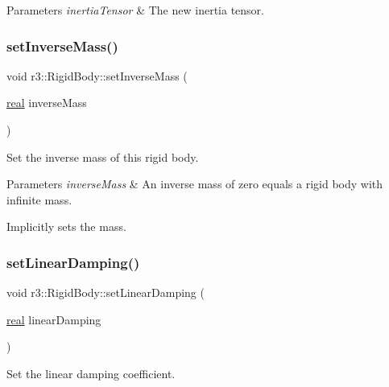 \begin{DoxyParams}{Parameters}
{\em inertia\+Tensor} & The new inertia tensor. \\
\hline
\end{DoxyParams}
\mbox{\label{classr3_1_1_rigid_body_a28ee9e1542663a4e704077e9327ddece}} 
\subsubsection{\texorpdfstring{set\+Inverse\+Mass()}{setInverseMass()}}
{\footnotesize\ttfamily void r3\+::\+Rigid\+Body\+::set\+Inverse\+Mass (\begin{DoxyParamCaption}\item[{\mbox{\hyperlink{namespacer3_ab2016b3e3f743fb735afce242f0dc1eb}{real}}}]{inverse\+Mass }\end{DoxyParamCaption})}



Set the inverse mass of this rigid body. 


\begin{DoxyParams}{Parameters}
{\em inverse\+Mass} & An inverse mass of zero equals a rigid body with infinite mass.\\
\hline
\end{DoxyParams}
Implicitly sets the mass. \mbox{\label{classr3_1_1_rigid_body_ac65bfd9fd7a12de59141fab3c02e8579}} 
\subsubsection{\texorpdfstring{set\+Linear\+Damping()}{setLinearDamping()}}
{\footnotesize\ttfamily void r3\+::\+Rigid\+Body\+::set\+Linear\+Damping (\begin{DoxyParamCaption}\item[{\mbox{\hyperlink{namespacer3_ab2016b3e3f743fb735afce242f0dc1eb}{real}}}]{linear\+Damping }\end{DoxyParamCaption})}



Set the linear damping coefficient. 


